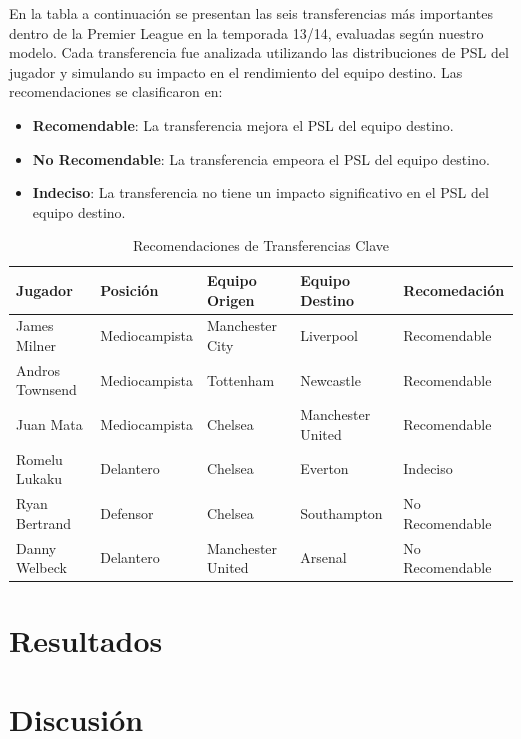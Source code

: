 \documentclass[
  a4paper,
]{article}
\begin{document}
En la tabla a continuación se presentan las seis transferencias más
importantes dentro de la Premier League en la temporada 13/14, evaluadas
según nuestro modelo. Cada transferencia fue analizada utilizando las
distribuciones de PSL del jugador y simulando su impacto en el
rendimiento del equipo destino. Las recomendaciones se clasificaron en:

\begin{itemize}
\item
  \textbf{Recomendable}: La transferencia mejora el PSL del equipo
  destino.
\item
  \textbf{No Recomendable}: La transferencia empeora el PSL del equipo
  destino.
\item
  \textbf{Indeciso}: La transferencia no tiene un impacto significativo
  en el PSL del equipo destino.
\end{itemize}

\begin{table}
\caption{Recomendaciones de Transferencias Clave}
\label{tab:recomendaciones_transferencias}
\begin{center}
\begin{tabular}{lllll}
\toprule
Jugador & Posición & Equipo Origen & Equipo Destino & Recomedación \\
\midrule
James Milner & Mediocampista & Manchester City & Liverpool & Recomendable \\
Andros Townsend & Mediocampista & Tottenham & Newcastle & Recomendable \\
Juan Mata & Mediocampista & Chelsea & Manchester United & Recomendable \\
Romelu Lukaku & Delantero & Chelsea & Everton & Indeciso \\
Ryan Bertrand & Defensor & Chelsea & Southampton & No Recomendable \\
Danny Welbeck & Delantero & Manchester United & Arsenal & No Recomendable \\
\bottomrule
\end{tabular}
\end{center}
\end{table}

\hypertarget{resultados}{%
\section{\texorpdfstring{\textbf{Resultados}}{Resultados}}\label{resultados}}

\hypertarget{discusiuxf3n}{%
\section{\texorpdfstring{\textbf{Discusión}}{Discusión}}\label{discusiuxf3n}}
\end{document}

